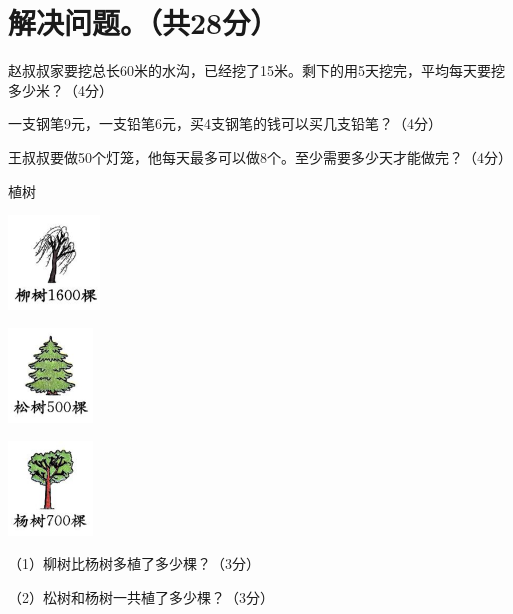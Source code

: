 \documentclass[12pt]{exam-zh}
\begin{document}
\vspace{2.5cm} %

\section{
  解决问题。（共28分）
}

\begin{problem}[index=1]
赵叔叔家要挖总长60米的水沟，已经挖了15米。剩下的用5天挖完，平均每天要挖多少米？（4分）
\end{problem}

\vspace{3cm} %

\begin{problem}[index=2]
一支钢笔9元，一支铅笔6元，买4支钢笔的钱可以买几支铅笔？（4分）
\end{problem}

\vspace{3cm} %

\begin{problem}[index=3]
王叔叔要做50个灯笼，他每天最多可以做8个。至少需要多少天才能做完？（4分）
\end{problem}
\vspace{3cm} %
\begin{problem}[index=4]
植树
\begin{multifigures}[columns=3,xshift=15mm]
\item \includegraphics[height=2.5cm]{9.png}
\item \includegraphics[height=2.5cm]{10.png}
\item \includegraphics[height=2.5cm]{11.png}
\end{multifigures}

（1）柳树比杨树多植了多少棵？（3分）

\vspace{3cm} %

（2）松树和杨树一共植了多少棵？（3分）

\vspace{2.5cm} %

\end{problem}
\end{document}
